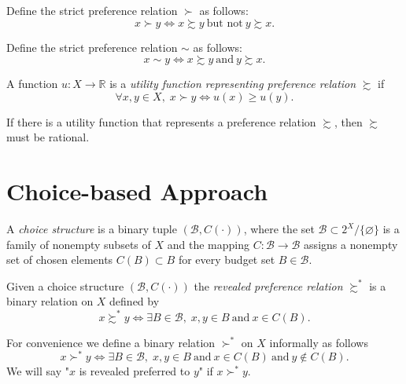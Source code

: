 \documentclass[11pt,fleqn]{book} %
\begin{document}
\begin{definition}
	Define the strict preference relation $\succ$ as follows:
	\[	
	x\succ y \Longleftrightarrow x\succsim y \ \text{but not}\  y\succsim x.
	\]
\end{definition}

\begin{definition}
	Define the strict preference relation $\sim$ as follows:
	\[	
	x\sim y \Longleftrightarrow x\succsim y \ \text{and}\  y\succsim x.
	\]
\end{definition}

\begin{definition}
    A function $u:X\rightarrow\mathbb{R}$ is a \emph{utility function representing preference relation} $\succsim$ if
    \[
    \forall x,y\in X,\;x\succ y\Longleftrightarrow u(x)\ge u(y).
    \]
\end{definition}

\begin{proposition}
	If there is a utility function that represents a preference relation $\succsim$, then $\succsim$ must be rational. 
\end{proposition}


\section{Choice-based Approach}

\begin{definition}
	A \emph{choice structure} is a binary tuple $(\mathcal{B},C(\cdot))$, where the set $\mathcal{B}\subset 2^X\slash \{\varnothing\}$ is a family of nonempty subsets of $X$ and the mapping $C:\mathcal{B}\rightarrow \mathcal{B}$ assigns a nonempty set of chosen elements $C(B)\subset B$ for every budget set $B\in\mathcal{B}$.
\end{definition}

\begin{definition}
	Given a choice structure $(\mathcal{B},C(\cdot))$ the \emph{revealed preference relation} $\succsim^*$ is a binary relation on $X$ defined by
	\[
	x\succsim^*y\Longleftrightarrow \exists B\in\mathcal{B},\;x,y\in B \ \text{and}\  x\in C(B).
	\]
\end{definition}

\begin{remark}
	For convenience we define a binary relation $\succ^*$ on $X$ informally as follows 
	\[
	x\succ^*y\Longleftrightarrow \exists B\in\mathcal{B},\;x,y\in B \ \text{and}\  x\in C(B) \ \text{and}\ y\notin C(B).
	\]
	We will say "$x$ is revealed preferred to $y$" if $x\succ^*y$.
\end{remark}
\end{document}
